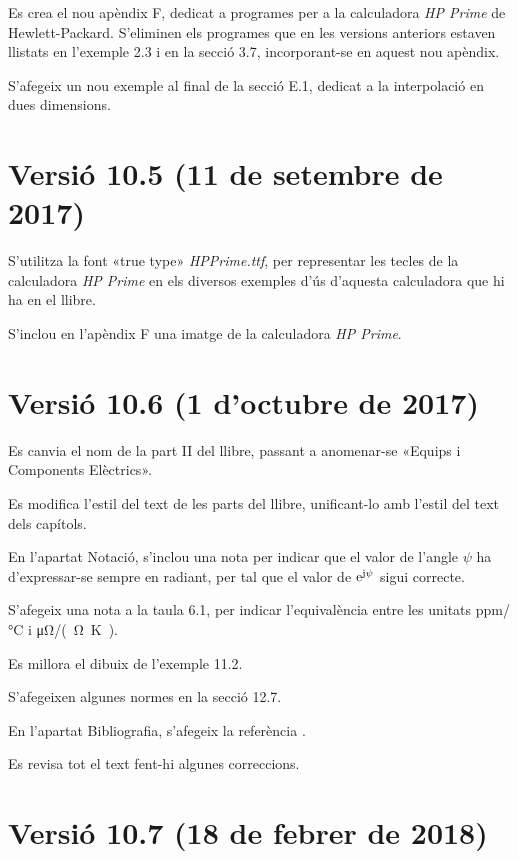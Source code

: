 Es crea el nou apèndix F, dedicat a programes per a la calculadora \emph{HP Prime} de Hewlett-Packard. S'eliminen els programes que en les versions anteriors estaven llistats en l'exemple 2.3 i en la secció 3.7, incorporant-se en aquest nou apèndix.

S'afegeix un nou exemple al final de la secció E.1, dedicat  a la interpolació en dues dimensions.

\section*{Versió 10.5 (11 de setembre de 2017)}

S'utilitza la font «true type» \emph{HPPrime.ttf}, per representar les tecles de la calculadora \emph{HP Prime} en els diversos exemples d'ús d'aquesta calculadora que hi ha en el llibre.

S'inclou en l'apèndix F una imatge de la calculadora \emph{HP Prime}.


\section*{Versió 10.6 (1 d'octubre de 2017)}

Es canvia el nom de la part II del llibre, passant a anomenar-se «Equips i Components Elèctrics».

Es modifica l'estil del text de les parts del llibre, unificant-lo amb l'estil del text dels capítols.

En l'apartat Notació, s'inclou una nota per indicar  que el valor de l'angle $\psi$ ha d'expressar-se sempre en radiant, per tal que el valor de $\mathrm{e}^{\mathrm{j}\psi}$ sigui correcte.

S'afegeix una nota a la taula 6.1, per indicar l'equivalència entre les unitats \si{ppm/\degreeCelsius}  i  \si{\micro\ohm/(\ohm.\kelvin)}.

Es millora el dibuix de l'exemple 11.2.

S’afegeixen algunes normes en la secció 12.7.

En l'apartat Bibliografia, s'afegeix la referència \cite{BUR}.

Es revisa tot el text fent-hi algunes correccions.


\section*{Versió 10.7 (18 de febrer de 2018)}

